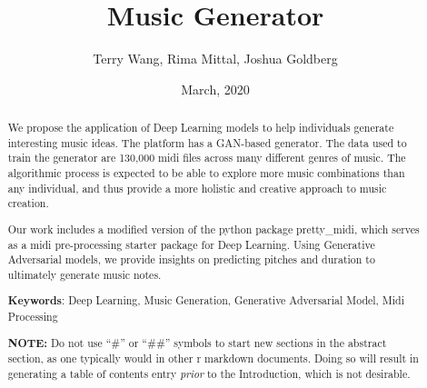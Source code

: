 \documentclass[12pt,oneside]{chicagocapstone}
\title{Music Generator}
\author{Terry Wang, Rima Mittal, Joshua Goldberg}
\date{March, 2020} %
\begin{document}
  \maketitle

\frontmatter %
\pagestyle{empty} %


  \begin{abstract}
    We propose the application of Deep Learning models to help individuals generate interesting music ideas. The platform has a GAN-based generator. The data used to train the generator are 130,000 midi files across many different genres of music. The algorithmic process is expected to be able to explore more music combinations than any individual, and thus provide a more holistic and creative approach to music creation.
    
    Our work includes a modified version of the python package pretty\_midi, which serves as a midi pre-processing starter package for Deep Learning. Using Generative Adversarial models, we provide insights on predicting pitches and duration to ultimately generate music notes.
    
    \bigskip 
    \bigskip
    \bigskip
    
    \textbf{Keywords}: Deep Learning, Music Generation, Generative Adversarial Model, Midi Processing
    
    \bigskip 
    \bigskip
    \bigskip
    
    \textbf{NOTE:} Do not use ``\#'' or ``\#\#'' symbols to start new sections in the abstract section, as one typically would in other r markdown documents. Doing so will result in generating a table of contents entry \emph{prior} to the Introduction, which is not desirable.
  \end{abstract}
\end{document}
